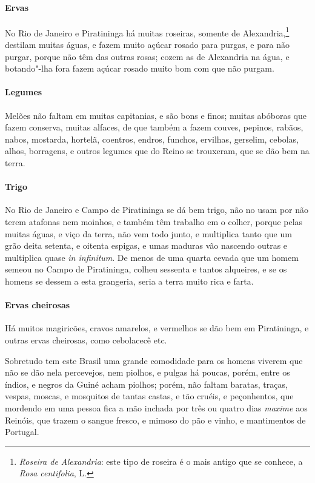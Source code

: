 \paragraph{Ervas} No Rio de Janeiro e Piratininga há muitas roseiras,
somente de Alexandria,\footnote{ \textit{Roseira de Alexandria}: este
tipo de roseira é o mais antigo que se conhece, a \textit{Rosa
centifolia}, L.} destilam muitas águas, e fazem muito açúcar rosado
para purgas, e para não purgar, porque não têm das outras rosas; cozem
as de Alexandria na água, e botando"-lha fora fazem açúcar rosado muito
bom com que não purgam.

\paragraph{Legumes} Melões não faltam em muitas capitanias, e são bons e
finos; muitas abóboras que fazem conserva, muitas alfaces, de que
também a fazem couves, pepinos, rabãos, nabos, mostarda, hortelã,
coentros, endros, funchos, ervilhas, gerselim, cebolas, alhos,
borragens, e outros legumes que do Reino se trouxeram, que se dão bem
na terra.

\paragraph{Trigo} No Rio de Janeiro e Campo de Piratininga se dá bem
trigo, não no usam por não terem atafonas nem moinhos, e também têm
trabalho em o colher, porque pelas muitas águas, e viço da terra, não
vem todo junto, e multiplica tanto que um grão deita setenta, e oitenta
espigas, e umas maduras vão nascendo outras e multiplica quase
\textit{in infinitum}. De menos de uma quarta cevada que um homem semeou no Campo
de Piratininga, colheu sessenta e tantos alqueires, e se os homens se
dessem a esta grangeria, seria a terra muito rica e farta.

\paragraph{Ervas cheirosas} Há muitos magiricões, cravos amarelos, e
vermelhos se dão bem em Piratininga, e outras ervas cheirosas, como
cebolacecê etc.

 Sobretudo tem este Brasil uma grande comodidade para os homens viverem
que não se dão nela percevejos, nem piolhos, e pulgas há poucas, porém,
entre os índios, e negros da Guiné acham piolhos; porém, não faltam
baratas, traças, vespas, moscas, e mosquitos de tantas castas, e tão
cruéis, e peçonhentos, que mordendo em uma pessoa fica a mão inchada
por três ou quatro dias \textit{maxime} aos Reinóis, que trazem o sangue fresco,
e mimoso do pão e vinho, e mantimentos de Portugal.


